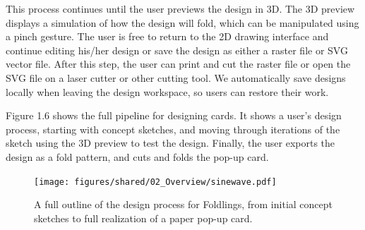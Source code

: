 This process continues until the user previews the design in 3D. The 3D
preview displays a simulation of how the design will fold, which can be
manipulated using a pinch gesture. The user is free to return to the 2D
drawing interface and continue editing his/her design or save the design
as either a raster file or SVG vector file. After this step, the user
can print and cut the raster file or open the SVG file on a laser cutter
or other cutting tool. We automatically save designs locally when
leaving the design workspace, so users can restore their work.

Figure 1.6 shows the full pipeline for designing cards. It shows a
user's design process, starting with concept sketches, and moving
through iterations of the sketch using the 3D preview to test the
design. Finally, the user exports the design as a fold pattern, and cuts
and folds the pop-up card.

\begin{figure}[htbp]
\centering
\texttt{[image: figures/shared/02\_Overview/sinewave.pdf]}
\caption{A full outline of the design process for Foldlings, from
initial concept sketches to full realization of a paper pop-up card.}
\end{figure}
